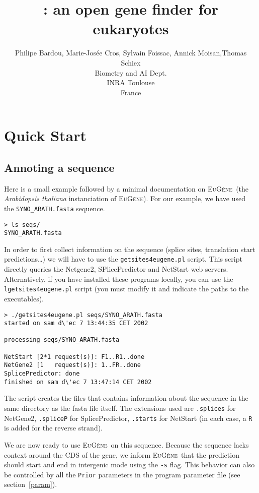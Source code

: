 \documentclass[a4paper,titlepage]{report}
\author{Philipe Bardou, Marie-Jos\'ee Cros, Sylvain Foissac, Annick Moisan,Thomas Schiex\\Biometry and AI Dept.\\ INRA Toulouse\\France}
\title{\EuGenie: an open gene finder for eukaryotes}
\newcommand{\EuGenie}{\textsc{EuG\`ene}}
\begin{document}
\maketitle
\tableofcontents

\chapter{Quick Start}
\section{Annoting a sequence}
Here is a small example followed by a minimal documentation on
\EuGenie\ (the \emph{Arabidopsis thaliana} instanciation of \EuGenie).
For our example, we have used the \texttt{SYNO\_ARATH.fasta} sequence.

\begin{Verbatim}[fontsize=\scriptsize]
> ls seqs/
SYNO_ARATH.fasta
\end{Verbatim}

In order to first collect information on the sequence (splice sites,
translation start predictions\ldots) we will have to use the
\texttt{getsites4eugene.pl} script. This script directly queries the
Netgene2, SPlicePredictor and NetStart web servers. Alternatively, if
you have installed these programs locally, you can use the
\texttt{lgetsites4eugene.pl} script (you must modify it and indicate
the paths to the executables). 

\begin{Verbatim}[fontsize=\scriptsize]
> ./getsites4eugene.pl seqs/SYNO_ARATH.fasta 
started on sam d\'ec 7 13:44:35 CET 2002

processing seqs/SYNO_ARATH.fasta

NetStart [2*1 request(s)]: F1..R1..done
NetGene2 [1   request(s)]: 1..FR..done
SplicePredictor: done
finished on sam d\'ec 7 13:47:14 CET 2002
\end{Verbatim}

The script creates the files that contains information about the
sequence in the same directory as the fasta file itself. The
extensions used are \texttt{.splices} for NetGene2, \texttt{.spliceP}
for SplicePredictor, \texttt{.starts} for NetStart (in each case, a
\texttt{R} is added for the reverse strand). 

We are now ready to use \EuGenie\ on this sequence. Because the
sequence lacks context around the CDS of the gene, we inform \EuGenie\ 
that the prediction should start and end in intergenic mode using the
\texttt{-s} flag. This behavior can also be controlled by all the
\texttt{Prior} parameters in the program parameter file (see
section~\ref{param}).
\end{document}
